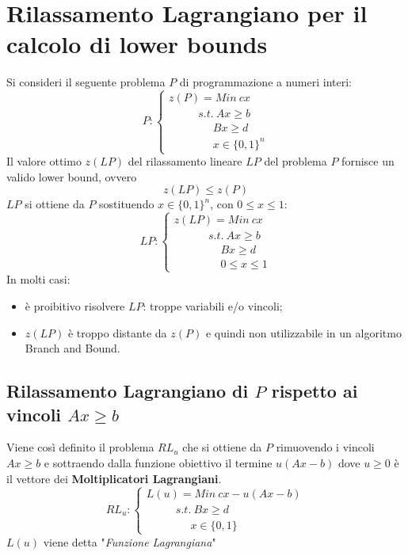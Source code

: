 \chapter{Rilassamento Lagrangiano per il calcolo di lower bounds}
Si consideri il seguente problema $P$ di programmazione a numeri interi:
\begin{displaymath}
P:
\begin{cases}
	z(P)=Min\ cx \\
	\ \ \ \ \ \ \ \ \ \ \ \ s.t.\ Ax\ge b \\
	\ \ \ \ \ \ \ \ \ \ \ \ \ \ \ \ \ \ Bx\ge d \\
	\ \ \ \ \ \ \ \ \ \ \ \ \ \ \ \ \ \ x\in\{0,1\}^{n} 
\end{cases}
\end{displaymath}
Il valore ottimo $z(LP)$ del rilassamento lineare $LP$ del problema $P$ fornisce un valido lower bound, ovvero
\begin{equation*}
	z(LP)\le z(P)
\end{equation*}
$LP$ si ottiene da $P$ sostituendo $x\in\{0,1\}^{n}$, con $0\le x\le 1$:
\begin{displaymath}
LP:
\begin{cases}
z(LP)=Min\ cx \\
\ \ \ \ \ \ \ \ \ \ \ \ \ \ s.t.\ Ax\ge b \\
\ \ \ \ \ \ \ \ \ \ \ \ \ \ \ \ \ \ \ Bx\ge d \\
\ \ \ \ \ \ \ \ \ \ \ \ \ \ \ \ \ \ \ 0\le x\le 1
\end{cases}
\end{displaymath}
In molti casi:
\begin{itemize}
	\item è proibitivo risolvere $LP$: troppe variabili e/o vincoli;
	\item $z(LP)$ è troppo distante da $z(P)$ e quindi non utilizzabile in un algoritmo Branch and Bound.
\end{itemize}

\section{Rilassamento Lagrangiano di $P$ rispetto ai vincoli $Ax\ge b$}
Viene così definito il problema $RL_{u}$ che si ottiene da $P$ rimuovendo i vincoli $Ax\ge b$ e sottraendo dalla funzione obiettivo il termine $u(Ax-b)$ dove $u\ge 0$ è il vettore dei \textbf{Moltiplicatori Lagrangiani}.
\begin{displaymath}
	RL_{u}:
	\begin{cases}
		L(u)=Min\ cx-u(Ax-b) \\
		\ \ \ \ \ \ \ \ \ \ \ \ s.t.\ Bx\ge d \\
		\ \ \ \ \ \ \ \ \ \ \ \ \ \ \ \ \ \ x\in\{0,1\}
	\end{cases}
\end{displaymath}
$L(u)$ viene detta "\textit{Funzione Lagrangiana}"

